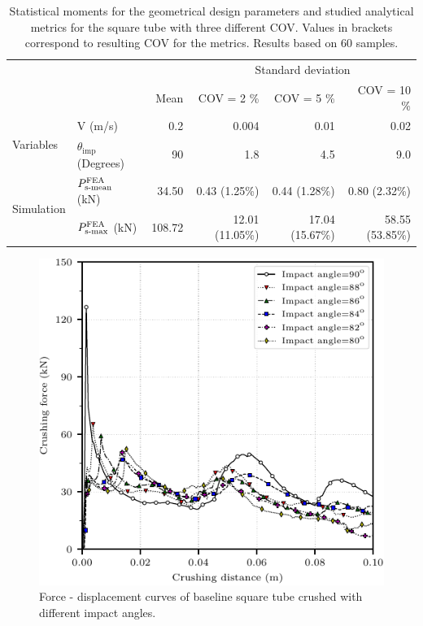 \documentclass[12pt,number,preprint,review,times]{elsarticle}
\begin{document}

\begin{table}[!htpb]
\begin{center}
\begin{tabular}[t]{llrrrr} \toprule
 & &  &  \multicolumn{3}{c}{Standard deviation}  \\\cmidrule{4-6}
&  & Mean       &    COV = 2 \%  &  COV = 5 \%      &    COV = 10 \%  \\\midrule
\multirow{2}{*}{Variables} & V (m/s)  &  0.2 &  0.004 & 0.01 & 0.02   \\
 & $\theta_{\mathrm{imp}}$ (Degrees) &  90 & 1.8 & 4.5 & 9.0 \\ \midrule
\multirow{2}{*}{Simulation} & $P^{\mathrm{FEA}}_{\mathrm{s{\text -}mean}}$ (kN) & 34.50  & 0.43 (1.25\%) & 0.44 (1.28\%) & 0.80 (2.32\%)  \\
& $P^{\mathrm{FEA}}_{\mathrm{s{\text -}max}}$ (kN) & 108.72  & 12.01 (11.05\%) & 17.04 (15.67\%) & 58.55 (53.85\%)  \\
\bottomrule
\end{tabular}
\captionsetup{justification=centering}
\caption{Statistical moments for the geometrical design parameters and studied analytical metrics for the square tube with three different COV. Values in brackets correspond to resulting COV for the metrics. Results based on 60 samples.}
\label{tab:UQ_sq3}
\end{center}
\end{table}

\begin{figure}[htpb]
  \centering
   \includegraphics[width=\columnwidth]{./fd-angle.pdf}
  \caption{Force - displacement curves of baseline square tube crushed with different impact angles.}
  \label{fig:fd-angle}
\end{figure}
\end{document}
